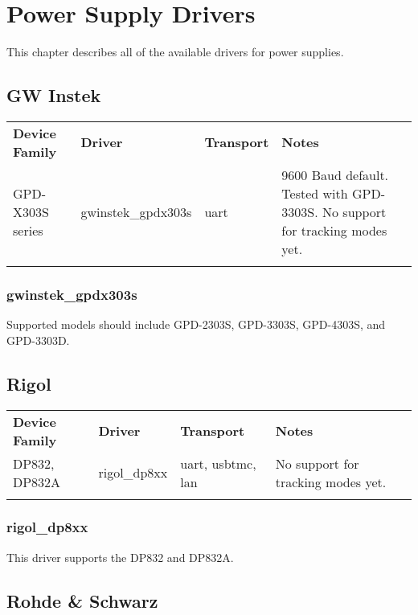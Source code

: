 \chapter{Power Supply Drivers}
\label{sec:powersupply-drivers}

This chapter describes all of the available drivers for power supplies.


\section{GW Instek}

\begin{tabularx}{16cm}{lllX}
\thickhline
\textbf{Device Family} & \textbf{Driver} & \textbf{Transport} & \textbf{Notes} \\
\thickhline
GPD-X303S series & gwinstek\_gpdx303s & uart & 9600 Baud default. Tested with GPD-3303S. No support for tracking modes yet.\\
\thickhline
\end{tabularx}

\subsection{gwinstek\_gpdx303s}

Supported models should include GPD-2303S, GPD-3303S, GPD-4303S, and GPD-3303D.

\section{Rigol}

\begin{tabularx}{16cm}{lllX}
\thickhline
\textbf{Device Family} & \textbf{Driver} & \textbf{Transport} & \textbf{Notes} \\
\thickhline
DP832, DP832A & rigol\_dp8xx & uart, usbtmc, lan & No support for tracking modes yet.\\
\thickhline
\end{tabularx}

\subsection{rigol\_dp8xx}

This driver supports the DP832 and DP832A.

\section{Rohde \& Schwarz}

